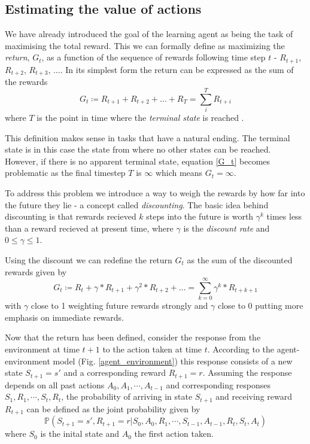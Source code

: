 \documentclass[11pt]{article}
\begin{document}
\maketitle


\subsection{Estimating the value of actions}

We have already introduced the goal of the learning agent as being the
task of maximising the total reward.
This we can formally define as maximizing the \textit{return}, $G_t$, as
a function of the sequence of rewards following time step $t$ - $R_{t+1}$,
$R_{t+2}$, $R_{t+3}$, $\hdots$.
In its simplest form the return can be expressed as the sum of the
rewards
\begin{equation}\label{G_t}
    G_t \coloneqq R_{t+1} + R_{t+2} + \hdots + R_{T} = \sum\limits_{i}^T R_{t+i}
\end{equation}
where $T$ is the point in time where the \textit{terminal state} is reached
\cite{RLBook}.

This definition makes sense in tasks that have a natural ending.
The terminal state is in this case the state from where no
other states can be reached.
However, if there is no apparent terminal state, equation \ref{G_t}
becomes problematic as the final timestep $T$ is $\infty$ which means $G_t = \infty$.

To address this problem we introduce a way to weigh the rewards by how far into the
future they lie - a concept called \textit{discounting}.
The basic idea behind discounting is that rewards recieved $k$ steps into the future
is worth $\gamma^k$ times less than a reward recieved at present time, where
$\gamma$ is the \textit{discount rate} and $0 \leq \gamma \leq 1$.

Using the discount we can redefine the return $G_t$ as the sum of the discounted
rewards given by
\begin{equation}\label{gammaG_t}
    G_t \coloneqq R_t + \gamma * R_{t+1} + \gamma^2 * R_{t+2} + \hdots 
        = \sum\limits_{k=0}^\infty \gamma^k * R_{t+k+1}
\end{equation}
with $\gamma$ close to 1 weighting future rewards strongly and $\gamma$ close to 0
putting more emphasis on immediate rewards.
\cite{}

Now that the return has been defined, consider the response from the environment at time $t + 1$
to the action taken at time $t$.
According to the agent-environment model (Fig. \ref{agent_environment}) this response consists
of a new state $S_{t+1} = s'$ and a corresponding reward $R_{t+1} = r$.
Assuming the response depends on all past actions $A_{0}, A_{1}, \cdots, A_{t-1}$ and
corresponding responses $S_{1}, R_{1}, \cdots, S_{t}, R_{t}$, the probability
of arriving in state $S_{t+1}$ and receiving reward $R_{t+1}$ can be defined as the
joint probability given by
\begin{equation}
    \mathds{P}(S_{t+1} = s', R_{t+1} = r | S_0, A_0, R_1, \cdots, S_{t-1}, A_{t-1}, R_{t}, S_{t}, A_{t})
\end{equation}
where $S_0$ is the inital state and $A_0$ the first action taken.
\end{document}
